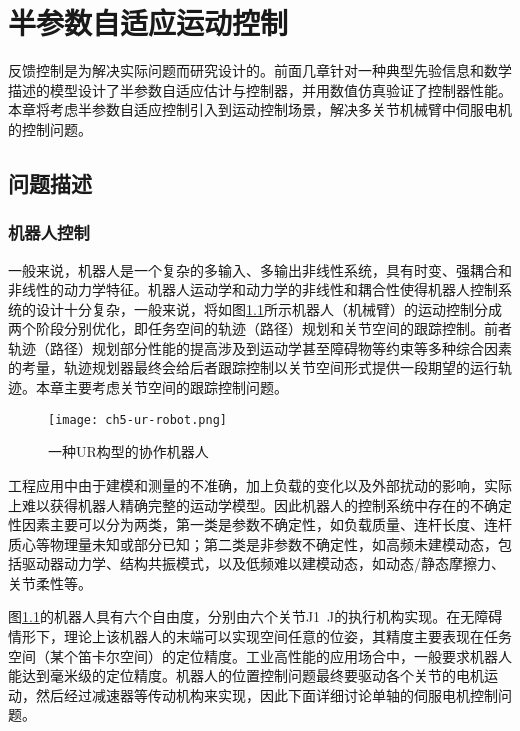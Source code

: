 \chapter{半参数自适应运动控制}\label{chap:5}
反馈控制是为解决实际问题而研究设计的。前面几章针对一种典型先验信息和数学描述的模型设计了半参数自适应估计与控制器，并用数值仿真验证了控制器性能。本章将考虑半参数自适应控制引入到运动控制场景，解决多关节机械臂中伺服电机的控制问题。
\section{问题描述}\label{chap:5.1}
\subsection{机器人控制}\label{5.1.1}
一般来说，机器人是一个复杂的多输入、多输出非线性系统，具有时变、强耦合和非线性的动力学特征。机器人运动学和动力学的非线性和耦合性使得机器人控制系统的设计十分复杂，一般来说，将如图\ref{fig.robot}所示机器人（机械臂）的运动控制分成两个阶段分别优化，即任务空间的轨迹（路径）规划和关节空间的跟踪控制。前者轨迹（路径）规划部分性能的提高涉及到运动学甚至障碍物等约束等多种综合因素的考量，轨迹规划器最终会给后者跟踪控制以关节空间形式提供一段期望的运行轨迹。本章主要考虑关节空间的跟踪控制问题。

\begin{figure}[!htb]
	\centering
	\texttt{[image: ch5-ur-robot.png]}\\	 %
	\caption{一种UR构型的协作机器人}
	\label{fig.robot}
\end{figure}

工程应用中由于建模和测量的不准确，加上负载的变化以及外部扰动的影响，实际上难以获得机器人精确完整的运动学模型。因此机器人的控制系统中存在的不确定性因素主要可以分为两类，第一类是参数不确定性，如负载质量、连杆长度、连杆质心等物理量未知或部分已知；第二类是非参数不确定性，如高频未建模动态，包括驱动器动力学、结构共振模式，以及低频难以建模动态，如动态/静态摩擦力、关节柔性等。

图\ref{fig.robot}的机器人具有六个自由度，分别由六个关节J1~J的执行机构实现。在无障碍情形下，理论上该机器人的末端可以实现空间任意的位姿，其精度主要表现在任务空间（某个笛卡尔空间）的定位精度。工业高性能的应用场合中，一般要求机器人能达到毫米级的定位精度。机器人的位置控制问题最终要驱动各个关节的电机运动，然后经过减速器等传动机构来实现，因此下面详细讨论单轴的伺服电机控制问题。

